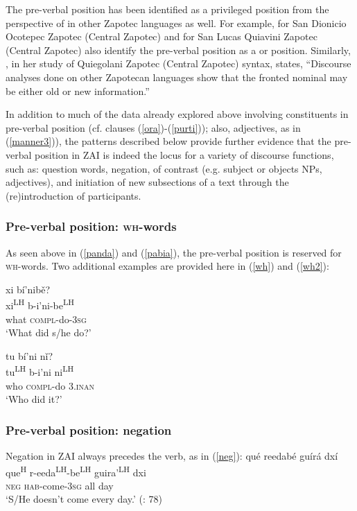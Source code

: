 The pre-verbal position has been identified as a privileged position from the perspective of  in other Zapotec languages as well. For example, \citet{broadwell2002} for San Dionicio Ocotepec Zapotec (Central Zapotec) and \citet{lee2000} for San Lucas Quiavini Zapotec (Central Zapotec) also identify the pre-verbal position as a  or  position. Similarly, \citet[103]{black2000}, in her study of Quiegolani Zapotec (Central Zapotec) syntax, states, ``Discourse analyses done on other Zapotecan languages show that the fronted nominal may be either old or new information.'' 

In addition to much of the data already explored above involving constituents in pre-verbal position (cf.  clauses (\ref{ora})-(\ref{purti})); also, adjectives, as in  (\ref{manner3})), the patterns described below provide further evidence that the pre-verbal position in ZAI is indeed the locus for a variety of discourse functions, such as: question words, negation,  of contrast (e.g. subject or objects NPs, adjectives), and initiation of new subsections of a text through the (re)introduction of participants.

\subsubsection{Pre-verbal position: \textsc{wh}-words}
As seen above in (\ref{panda}) and (\ref{pabia}), the pre-verbal position is reserved for \textsc{wh}-words. Two additional examples are provided here in (\ref{wh}) and (\ref{wh2}): 

\ea\label{wh}
xi b\'{i}'nib\v{e}? \\
xi\textsuperscript{LH} b-i'ni-be\textsuperscript{LH} \\
what \textsc{compl}-do-3\textsc{sg} \\
\glt `What did s/he do?' 
\z

\ea\label{wh2}
tu b\'{i}'ni n\v{i}? \\
tu\textsuperscript{LH} b-i'ni ni\textsuperscript{LH} \\
who \textsc{compl}-do 3.\textsc{inan} \\
\glt `Who did it?'  
\z

\subsubsection{Pre-verbal position: negation}
Negation in ZAI always precedes the verb, as in (\ref{neg}):
\ea\label{neg}
\glll qué reedabé gu\'{i}rá dx\'{i} \\
 que\textsuperscript{H} r-eeda\textsuperscript{LH}-be\textsuperscript{LH} guira'\textsuperscript{LH} dxi \\
\textsc{neg} \textsc{hab}-come-3\textsc{sg} all day \\
\glt `S/He doesn't come every day.' \hfill (\citealt{pickett1998}: 78)

